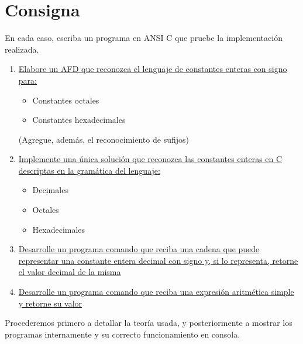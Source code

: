 \documentclass[a4paper, 12pt]{article}
\begin{document}
\newpage

\tableofcontents

\newpage


\section{Consigna} \label{consigna}
\bigbreak
En cada caso, escriba un programa en ANSI C que pruebe la implementación realizada.

\bigskip

\begin{enumerate} %
\item \hyperref[ej-constantes]{Elabore un AFD que reconozca el lenguaje de constantes enteras con signo para:}
    \begin{itemize}
        \item Constantes octales
        \item Constantes hexadecimales
    \end{itemize}
(Agregue, además, el reconocimiento de sufijos)

\bigskip

\item \hyperref[ej-reconocedor]{Implemente una única solución que reconozca las constantes enteras en C descriptas en la gramática del lenguaje:}
\begin{itemize}
    \item Decimales
    \item Octales
    \item Hexadecimales
\end{itemize}

\bigskip

\item \hyperref[ej-valordecimal]{Desarrolle un programa comando que reciba una cadena que puede representar una constante entera decimal con signo y, si lo representa, retorne el valor decimal de la misma}

\bigskip

\item \hyperref[ej-operacion]{Desarrolle un programa comando que reciba una expresión aritmética simple y retorne su valor}
\end{enumerate}

\vspace{1cm}

Procederemos primero a detallar la teoría usada, y posteriormente a mostrar los programas internamente y su correcto funcionamiento en consola.
\end{document}
